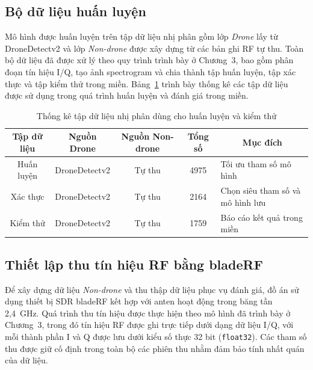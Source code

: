 \documentclass[../DoAn.tex]{subfiles}
\begin{document}
\subsection{Bộ dữ liệu huấn luyện}

Mô hình được huấn luyện trên tập dữ liệu nhị phân gồm lớp \textit{Drone} lấy từ DroneDetectv2 và lớp \textit{Non-drone} được xây dựng từ các bản ghi RF tự thu. Toàn bộ dữ liệu đã được xử lý theo quy trình trình bày ở Chương~3, bao gồm phân đoạn tín hiệu I/Q, tạo ảnh spectrogram và chia thành tập huấn luyện, tập xác thực và tập kiểm thử trong miền. Bảng~\ref{tab:dronedetect_statistics} trình bày thống kê các tập dữ liệu được sử dụng trong quá trình huấn luyện và đánh giá trong miền.

\begin{table}[H]
    \centering
    \renewcommand{\arraystretch}{1.3}
    \small
    \setlength{\tabcolsep}{4pt}
    \begin{tabular}{|c|c|c|c|p{}|}
        \hline
        \textbf{Tập dữ liệu} & \textbf{Nguồn Drone} & \textbf{Nguồn Non-drone} & \textbf{Tổng số} & \multicolumn{1}{c|}{\textbf{Mục đích}} \\ \hline
        Huấn luyện & DroneDetectv2 & Tự thu & 4975 & Tối ưu tham số mô hình \\ \hline
        Xác thực & DroneDetectv2 & Tự thu & 2164 & Chọn siêu tham số và mô hình lưu \\ \hline
        Kiểm thử & DroneDetectv2 & Tự thu & 1759 & Báo cáo kết quả trong miền \\ \hline
    \end{tabular}
    \caption{Thống kê tập dữ liệu nhị phân dùng cho huấn luyện và kiểm thử}
    \label{tab:dronedetect_statistics}
\end{table}

\subsection{Thiết lập thu tín hiệu RF bằng bladeRF}

Để xây dựng dữ liệu \textit{Non-drone} và thu thập dữ liệu phục vụ đánh giá, đồ án sử dụng thiết bị SDR bladeRF kết hợp với anten hoạt động trong băng tần 2,4~GHz. Quá trình thu tín hiệu được thực hiện theo mô hình đã trình bày ở Chương~3, trong đó tín hiệu RF được ghi trực tiếp dưới dạng dữ liệu I/Q, với mỗi thành phần I và Q được lưu dưới kiểu số thực 32 bit (\texttt{float32}). Các tham số thu được giữ cố định trong toàn bộ các phiên thu nhằm đảm bảo tính nhất quán của dữ liệu.
\end{document}
